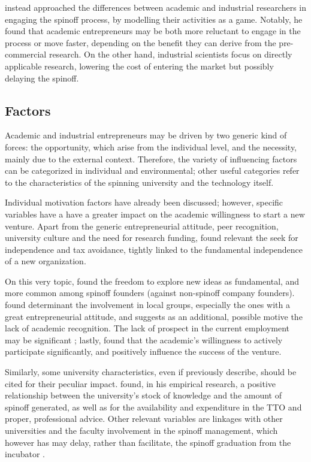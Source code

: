 \citet{Lacetera2006} instead approached the differences between academic and industrial researchers in engaging the spinoff process, by modelling their activities as a game. Notably, he found that academic entrepreneurs may be both more reluctant to engage in the process or move faster, depending on the benefit they can derive from the pre-commercial research. On the other hand, industrial scientists focus on directly applicable research, lowering the cost of entering the market but possibly delaying the spinoff.   

\subsection{Factors}

Academic and industrial entrepreneurs may be driven by two generic kind of forces: the opportunity, which arise from the individual level, and the necessity, mainly due to the external context. Therefore, the variety of influencing factors can be categorized in individual and environmental; other useful categories refer to the characteristics of the spinning university and the technology itself.

Individual motivation factors have already been discussed; however, specific variables have a have a greater impact on the academic willingness to start a new venture. Apart from the generic entrepreneurial attitude, peer recognition, university culture and the need for research funding, \citet{Rizzo2015} found relevant the seek for independence and tax avoidance, tightly linked to the fundamental independence of a new organization. 

On this very topic, \citet{Perez2003} found the freedom to explore new ideas as fundamental, and more common among spinoff founders (against non-spinoff company founders). \citet{Siegel2007} found determinant the involvement in local groups, especially the ones with a great entrepreneurial attitude, and suggests as an additional, possible motive the lack of academic recognition. The lack of prospect in the current employment may be significant \citep{Rizzo2015}; lastly, \citet{Ittelson2002} found that the academic's willingness to actively participate significantly, and positively influence the success of the venture.

Similarly,  some university characteristics, even if previously describe, should be cited for their peculiar impact. \citet{Lockett2005a} found, in his empirical research, a positive relationship between the university's stock of knowledge and the amount of spinoff generated, as well as for the availability and expenditure in the TTO and proper, professional advice. Other relevant variables are linkages with other universities and the faculty involvement in the spinoff management, which however has may delay, rather than facilitate, the spinoff graduation from the incubator \citep{Rothaermel2005}.

